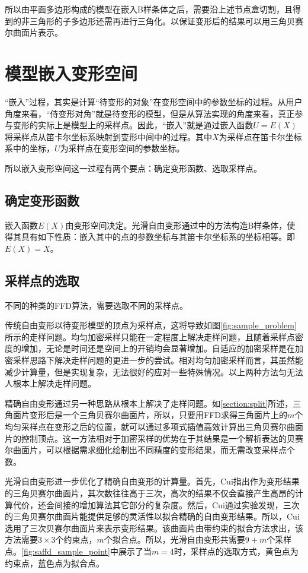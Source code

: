 所以由平面多边形构成的模型在嵌入B样条体之后，需要沿上述节点盒切割，且得到的非三角形的子多边形还需再进行三角化。以保证变形后的结果可以用三角贝赛尔曲面片表示。

\section{模型嵌入变形空间}
“嵌入”过程，其实是计算“待变形的对象”在变形空间中的参数坐标的过程。从用户角度来看，“侍变形对角”就是待变形的模型，但是从算法实现的角度来看，真正参与变形的实际上是模型上的采样点。因此，“嵌入”就是通过嵌入函数$U=E(X)$将采样点从笛卡尔坐标系映射到变形中间中的过程。其中$X$为采样点在笛卡尔坐标系中的坐标，$U$为采样点在变形空间的参数坐标。

所以嵌入变形空间这一过程有两个要点：确定变形函数、选取采样点。

\subsection{确定变形函数}

嵌入函数$E(X)$由变形空间决定。光滑自由变形通过\cite{Feng02}中的方法构造B样条体，使得其具有如下性质：嵌入其中的点的参数坐标与其笛卡尔坐标系的坐标相等。即$E(X)=X$。

\subsection{采样点的选取}
不同的种类的FFD算法，需要选取不同的采样点。

传统自由变形以待变形模型的顶点为采样点，这将导致如图\autoref{fig:sample_problem}所示的走样问题。均匀加密采样只能在一定程度上解决走样问题，且随着采样点密度的增加，无论是时间还是空间上的开销均会显著增加。自适应的加密采样是在加密采样思路下解决走样问题的更进一步的尝试。相对均匀加密采样而言，其虽然能减少计算量，但是实现复杂，无法很好的应对一些特殊情况。以上两种方法匀无法人根本上解决走样问题。

精确自由变形\cite{Feng00}通过另一种思路从根本上解决了走样问题。如\ref{section:split}所述，三角面片变形后是一个三角贝赛尔曲面片，所以，只要用FFD求得三角面片上的$m$个均匀采样点在变形之后的位置，就可以通过多项式插值高效计算出三角贝赛尔曲面片的控制顶点。这一方法相对于加密采样的优势在于其结果是一个解析表达的贝赛尔曲面片，可以根据需求细化绘制出不同精度的变形结果，而无需改变采样点个数。

光滑自由变形\cite{Cui15}进一步优化了精确自由变形的计算量。首先，Cui指出作为变形结果的三角贝赛尔曲面片，其次数往往高于三次，高次的结果不仅会直接产生高昂的计算代价，还会间接的增加算法其它部分的复杂度。然后，Cui通过实验发现，三次的三角贝赛尔曲面片能提供足够的灵活性以拟合精确的自由变形结果。所以，Cui选用了三次贝赛尔曲面片来表示变形结果。该曲面片由带约束的拟合方法求出，该方法需要$3\times3$个约束点，$m$个拟合点。所以，光滑自由变形共需要$9+m$个采样点。\autoref{fig:saffd_sample_point}中展示了当$m=4$时，采样点的选取方式，黄色点为约束点，蓝色点为拟合点。

